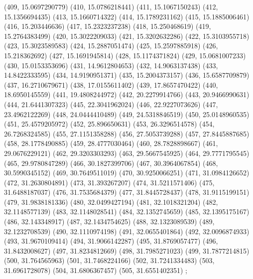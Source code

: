 {					(409, 15.0697290779)
					(410, 15.0786218441)
					(411, 15.1067150243)
					(412, 15.1356694435)
					(413, 15.1660714322)
					(414, 15.1789231162)
					(415, 15.1885006461)
					(416, 15.203446636)
					(417, 15.2323237238)
					(418, 15.250468619)
					(419, 15.2764383499)
					(420, 15.3022209033)
					(421, 15.3202632286)
					(422, 15.3103955718)
					(423, 15.3023589583)
					(424, 15.2887051474)
					(425, 15.2597885918)
					(426, 15.218362692)
					(427, 15.1691945814)
					(428, 15.1174371824)
					(429, 15.0681007233)
					(430, 15.0153353696)
					(431, 14.9612804653)
					(432, 14.9063137438)
					(433, 14.8422333595)
					(434, 14.9190951371)
					(435, 15.2004373157)
					(436, 15.6587709879)
					(437, 16.2710679671)
					(438, 17.0155611402)
					(439, 17.8657470422)
					(440, 18.6950145559)
					(441, 19.4808244972)
					(442, 20.2279914766)
					(443, 20.9466990631)
					(444, 21.6441307323)
					(445, 22.3041962024)
					(446, 22.9227073626)
					(447, 23.4962122269)
					(448, 24.0444410489)
					(449, 24.5318846519)
					(450, 25.0148960535)
					(451, 25.4579205972)
					(452, 25.896650631)
					(453, 26.3296514578)
					(454, 26.7268324585)
					(455, 27.1151358288)
					(456, 27.5053739288)
					(457, 27.8445887685)
					(458, 28.1778490885)
					(459, 28.4777030464)
					(460, 28.7828898667)
					(461, 29.0676229121)
					(462, 29.3203303293)
					(463, 29.5667545925)
					(464, 29.7771795545)
					(465, 29.9780847289)
					(466, 30.1827399706)
					(467, 30.3964067854)
					(468, 30.5990345152)
					(469, 30.7649511019)
					(470, 30.9250066251)
					(471, 31.0984126652)
					(472, 31.2630804891)
					(473, 31.393267207)
					(474, 31.5211571406)
					(475, 31.6488187037)
					(476, 31.7535684379)
					(477, 31.8445728437)
					(478, 31.9115199151)
					(479, 31.9838181336)
					(480, 32.0499427194)
					(481, 32.1018321204)
					(482, 32.1148577139)
					(483, 32.1148028541)
					(484, 32.1352745659)
					(485, 32.1395175167)
					(486, 32.143348917)
					(487, 32.1434754625)
					(488, 32.1323089539)
					(489, 32.1232708539)
					(490, 32.1110974198)
					(491, 32.0655401864)
					(492, 32.0096874933)
					(493, 31.9670109414)
					(494, 31.9066142287)
					(495, 31.8769057477)
					(496, 31.8432008627)
					(497, 31.8234812669)
					(498, 31.7985271023)
					(499, 31.7877214815)
					(500, 31.764565963)
					(501, 31.7468224166)
					(502, 31.7241334483)
					(503, 31.6961728078)
					(504, 31.6806367457)
					(505, 31.6551402351)
				};
